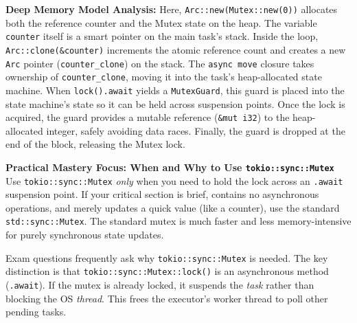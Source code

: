 \textbf{Deep Memory Model Analysis:}
Here, \texttt{Arc::new(Mutex::new(0))} allocates both the reference counter and the Mutex state on the heap. The variable \texttt{counter} itself is a smart pointer on the main task's stack. Inside the loop, \texttt{Arc::clone(\&counter)} increments the atomic reference count and creates a new \texttt{Arc} pointer (\texttt{counter\_clone}) on the stack. The \texttt{async move} closure takes ownership of \texttt{counter\_clone}, moving it into the task's heap-allocated state machine. When \texttt{lock().await} yields a \texttt{MutexGuard}, this guard is placed into the state machine's state so it can be held across suspension points. Once the lock is acquired, the guard provides a mutable reference (\texttt{\&mut i32}) to the heap-allocated integer, safely avoiding data races. Finally, the guard is dropped at the end of the block, releasing the Mutex lock.

\textbf{Practical Mastery Focus: When and Why to Use \texttt{tokio::sync::Mutex}}
Use \texttt{tokio::sync::Mutex} \textit{only} when you need to hold the lock across an \texttt{.await} suspension point. If your critical section is brief, contains no asynchronous operations, and merely updates a quick value (like a counter), use the standard \texttt{std::sync::Mutex}. The standard mutex is much faster and less memory-intensive for purely synchronous state updates.


\begin{exambox}
Exam questions frequently ask why \texttt{tokio::sync::Mutex} is needed. The key distinction is that \texttt{tokio::sync::Mutex::lock()} is an asynchronous method (\texttt{.await}). If the mutex is already locked, it suspends the \textit{task} rather than blocking the OS \textit{thread}. This frees the executor's worker thread to poll other pending tasks.
\end{exambox}

